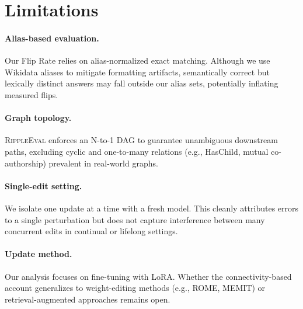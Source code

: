 \section*{Limitations}

\paragraph{Alias-based evaluation.} Our Flip Rate relies on
alias-normalized exact matching. Although we use Wikidata aliases to
mitigate formatting artifacts, semantically correct but lexically
distinct answers may fall outside our alias sets, potentially
inflating measured flips.

\paragraph{Graph topology.} \textsc{RippleEval} enforces an N-to-1
DAG to guarantee unambiguous downstream paths, excluding cyclic and
one-to-many relations (e.g., HasChild, mutual co-authorship)
prevalent in real-world graphs.

\paragraph{Single-edit setting.} We isolate one update at a time
with a fresh model. This cleanly attributes errors to a single
perturbation but does not capture interference between many
concurrent edits in continual or lifelong settings.

\paragraph{Update method.} Our analysis focuses on fine-tuning with
LoRA. Whether the connectivity-based account generalizes to
weight-editing methods (e.g., ROME, MEMIT) or retrieval-augmented
approaches remains open.